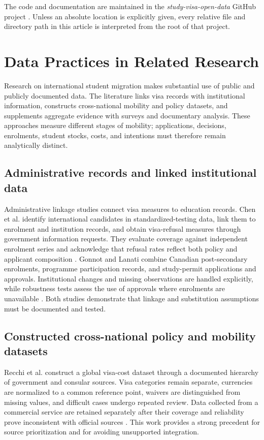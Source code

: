 \documentclass[runningheads]{llncs}
\begin{document}
The code and documentation are maintained in the \emph{study-visa-open-data} GitHub project \cite{repository}. Unless an absolute location is explicitly given, every relative file and directory path in this article is interpreted from the root of that project.

\section{Data Practices in Related Research}

Research on international student migration makes substantial use of public and publicly documented data. The literature links visa records with institutional information, constructs cross-national mobility and policy datasets, and supplements aggregate evidence with surveys and documentary analysis. These approaches measure different stages of mobility; applications, decisions, enrolments, student stocks, costs, and intentions must therefore remain analytically distinct.

\subsection{Administrative records and linked institutional data}

Administrative linkage studies connect visa measures to education records. Chen et al. identify international candidates in standardized-testing data, link them to enrolment and institution records, and obtain visa-refusal measures through government information requests. They evaluate coverage against independent enrolment series and acknowledge that refusal rates reflect both policy and applicant composition \cite{chen2023}. Gonnot and Lanati combine Canadian post-secondary enrolments, programme participation records, and study-permit applications and approvals. Institutional changes and missing observations are handled explicitly, while robustness tests assess the use of approvals where enrolments are unavailable \cite{gonnot2025}. Both studies demonstrate that linkage and substitution assumptions must be documented and tested.

\subsection{Constructed cross-national policy and mobility datasets}

Recchi et al. construct a global visa-cost dataset through a documented hierarchy of government and consular sources. Visa categories remain separate, currencies are normalized to a common reference point, waivers are distinguished from missing values, and difficult cases undergo repeated review. Data collected from a commercial service are retained separately after their coverage and reliability prove inconsistent with official sources \cite{recchi2021}. This work provides a strong precedent for source prioritization and for avoiding unsupported integration.
\end{document}
